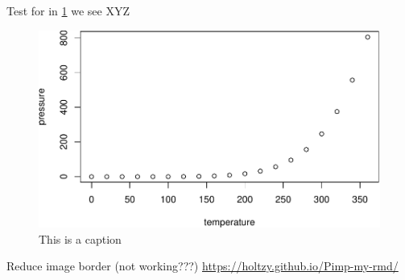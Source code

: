 \documentclass[11pt,]{article}
\newenvironment{Shaded}{\begin{snugshade}}{\end{snugshade}}
\newcommand{\NormalTok}[1]{\textcolor[rgb]{0.12,0.11,0.11}{#1}}
\newcommand{\OperatorTok}[1]{\textcolor[rgb]{0.12,0.11,0.11}{#1}}
\begin{document}
\begin{Shaded}
\begin{Highlighting}[]
\OperatorTok{%
\end{Highlighting}
\end{Shaded}

Test for in \ref{fig:fig1} we see XYZ

\begin{figure}
\centering
\includegraphics{MD_Final_files/figure-latex/fig1-1.pdf}
\caption{\label{fig:fig1}This is a caption}
\end{figure}

Reduce image border (not working???)
\url{https://holtzy.github.io/Pimp-my-rmd/}
\end{document}
